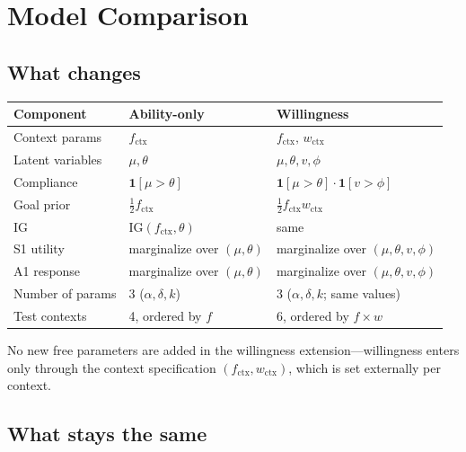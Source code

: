 \documentclass[11pt]{article}
\begin{document}
\section{Model Comparison}
\label{sec:comparison}

\subsection{What changes}

\begin{center}
\renewcommand{\arraystretch}{1.3}
\begin{tabular}{lll}
\toprule
\textbf{Component} & \textbf{Ability-only} & \textbf{Willingness} \\
\midrule
Context params   & $f_{\text{ctx}}$ & $f_{\text{ctx}},\, w_{\text{ctx}}$ \\
Latent variables & $\mu, \theta$ & $\mu, \theta, v, \phi$ \\
Compliance       & $\mathbf{1}[\mu > \theta]$ & $\mathbf{1}[\mu > \theta]\cdot\mathbf{1}[v > \phi]$ \\
Goal prior       & $\frac{1}{2}f_{\text{ctx}}$ & $\frac{1}{2}f_{\text{ctx}} w_{\text{ctx}}$ \\
IG               & $\mathrm{IG}(f_{\text{ctx}}, \theta)$ & same \\
S1 utility       & marginalize over $(\mu, \theta)$ & marginalize over $(\mu, \theta, v, \phi)$ \\
A1 response      & marginalize over $(\mu, \theta)$ & marginalize over $(\mu, \theta, v, \phi)$ \\
Number of params & 3 ($\alpha, \delta, k$) & 3 ($\alpha, \delta, k$; same values) \\
Test contexts    & 4, ordered by $f$ & 6, ordered by $f \times w$ \\
\bottomrule
\end{tabular}
\end{center}

No new free parameters are added in the willingness extension---willingness enters
only through the context specification $(f_{\text{ctx}}, w_{\text{ctx}})$, which is
set externally per context.

\subsection{What stays the same}
\end{document}
